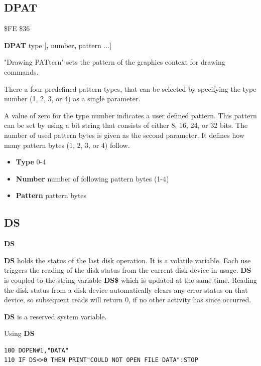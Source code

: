 \subsection{DPAT}
\begin{description}[leftmargin=2cm,style=nextline]
\item [Token:] \$FE \$36
\item [Format:] {\bf DPAT} type [{\bf,} number{\bf,} pattern ...]
\item [Usage:]
   "Drawing PATtern" sets the pattern
   of the graphics context for drawing commands.

   There a four predefined pattern types, that can be selected
   by specifying the type number (1, 2, 3, or 4) as a single parameter.

   A value of zero for the type number indicates a user defined pattern.
   This pattern can be set by using a bit string that consists of either 8, 16, 24, or 32 bits.
   The number of used pattern bytes is given as the second parameter.
   It defines how many pattern bytes (1, 2, 3, or 4) follow.

    \begin{itemize}
       \item {\bf Type}    0-4
       \item {\bf Number}  number of following pattern bytes (1-4)
       \item {\bf Pattern} pattern bytes
    \end{itemize}
\end{description}


\newpage
\subsection{DS}
\begin{description}[leftmargin=2cm,style=nextline]
\item [Format:] {\bf DS}
\item [Usage:]  {\bf DS} holds the status of the last disk operation.
                It is a volatile variable.
                Each use triggers the reading of the disk status
                from the current disk device in usage.
                {\bf DS} is coupled to the string variable {\bf DS\$}
                which is updated at the same time.
                Reading the disk status from a disk device automatically
                clears any error status on that device, so subsequent reads
                will return 0, if no other activity has since occurred.
\item[Remarks:] {\bf DS} is a reserved system variable.

\item [Example:] Using {\bf DS}
\begin{tcolorbox}[colback=black,coltext=white]
\verbatimfont{\codefont}
\begin{verbatim}
100 DOPEN#1,"DATA"
110 IF DS<>0 THEN PRINT"COULD NOT OPEN FILE DATA":STOP
\end{verbatim}
\end{tcolorbox}
\end{description}

